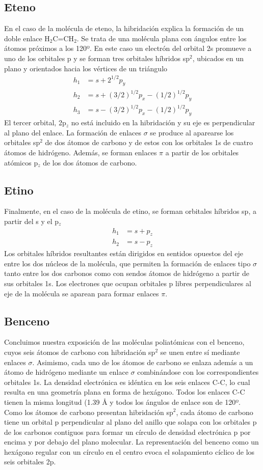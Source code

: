 \subsection{Eteno}
En el caso de la molécula de eteno, la hibridación explica
la formación de un doble enlace H$_2$C=CH$_2$. Se trata de 
una molécula plana con ángulos entre los átomos próximos
a los 120º. En este caso un electrón del orbital 2s promueve
a uno  de los orbitales p y se forman tres orbitales híbridos
sp$^2$, ubicados en un plano y orientados hacia los vértices
de un triángulo
\begin{align*}
    h_1&=s+2^{1/2}p_y\\
    h_2&=s+(3/2)^{1/2}p_x-(1/2)^{1/2}p_y\\
    h_3&=s-(3/2)^{1/2}p_x-(1/2)^{1/2}p_y
\end{align*}
El tercer orbital, 2p$_z$ no está incluido
en la hibridación y su eje es perpendicular al plano del
enlace.  La formación de enlaces $\sigma$ se produce al aparearse
los orbitales sp$^2$ de dos átomos de carbono y de estos
con los orbitales 1s de cuatro átomos de hidrógeno. Además,
se forman enlaces $\pi$ a partir de los orbitales atómicos
p$_z$ de los dos átomos de carbono.

\subsection{Etino}
Finalmente, en el caso de la molécula de etino, se forman
orbitales híbridos sp, a partir del s y el p$_z$
\begin{align*}
    h_1&=s+p_z\\
    h_2&=s-p_z
\end{align*}
Los orbitales híbridos resultantes están dirigidos en sentidos
opuestos del eje entre los dos núcleos de la molécula, que
permiten la formación de enlaces tipo $\sigma$ tanto entre
los dos carbonos como con sendos átomos de hidrógeno
a partir de sus orbitales 1s. Los electrones que ocupan orbitales
p libres perpendiculares al eje de la molécula se aparean
para formar enlaces $\pi$.

\subsection{Benceno}
Concluimos nuestra exposición de las moléculas poliatómicas
con el benceno, cuyos seis átomos de carbono con hibridación 
sp$^2$ se unen entre sí mediante enlaces $\sigma$. Asimismo,
cada uno de los átomos de carbono se enlaza además a un átomo 
de hidrógeno mediante un enlace $\sigma$ combinándose con los
correspondientes orbitales 1s. La densidad electrónica es 
idéntica en los seis enlaces C-C, lo cual resulta en una geometría
plana en forma de hexágono. Todos los enlaces C-C tienen la 
misma longitud (1.39 {\AA} y todos los ángulos de enlace 
son de 120º. Como los átomos de carbono presentan hibridación
sp$^2$, cada átomo de carbono tiene un orbital p perpendicular
al plano del anillo que solapa con los orbitales p de los 
carbonos contiguos para formar un círculo de densidad electrónica 
p por encima y por debajo del plano molecular.
La representación del benceno como un hexágono regular con un 
círculo en el centro evoca el solapamiento cíclico de los seis
orbitales 2p.

